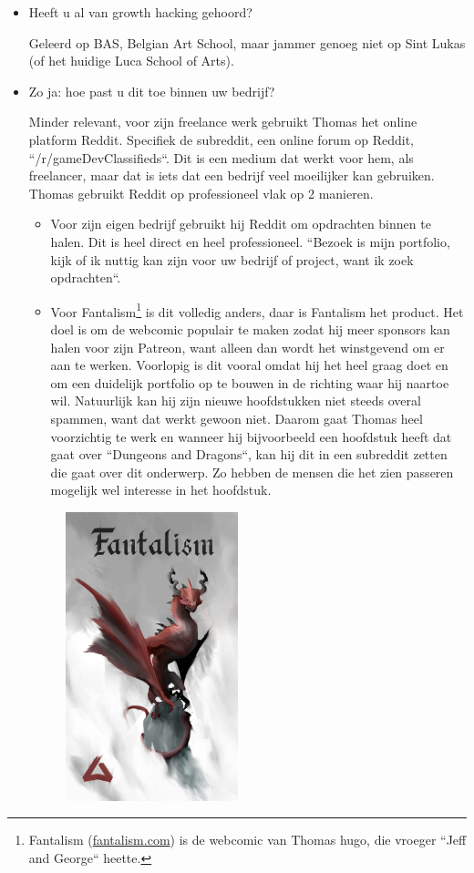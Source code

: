 \begin{itemize} 
	\item Heeft u al van growth hacking gehoord?
	
Geleerd op BAS, Belgian Art School, maar jammer genoeg niet op Sint Lukas (of het huidige Luca School of Arts). 
	
	\item Zo ja: hoe past u dit toe binnen uw bedrijf?
	
	Minder relevant, voor zijn freelance werk gebruikt Thomas het online platform Reddit. Specifiek de subreddit, een online forum op Reddit, ``/r/gameDevClassifieds``. Dit is een medium dat werkt voor hem, als freelancer, maar dat is iets dat een bedrijf veel moeilijker kan gebruiken. Thomas gebruikt Reddit op professioneel vlak op 2 manieren. 
	
	\begin{itemize} 
		\item Voor zijn eigen bedrijf gebruikt hij Reddit om opdrachten binnen te halen. Dit is heel direct en heel professioneel. ``Bezoek is mijn portfolio, kijk of ik nuttig kan zijn voor uw bedrijf of project, want ik zoek opdrachten``.
		\item Voor Fantalism\footnote{Fantalism (\href{https://fantalism.com/}{fantalism.com}) is de webcomic van Thomas hugo, die vroeger ``Jeff and George`` heette.} is dit volledig anders, daar is Fantalism het product. Het doel is om de webcomic populair te maken zodat hij meer sponsors kan halen voor zijn Patreon, want alleen dan wordt het winstgevend om er aan te werken. Voorlopig is dit vooral omdat hij het heel graag doet en om een duidelijk portfolio op te bouwen in de richting waar hij naartoe wil. Natuurlijk kan hij zijn nieuwe hoofdstukken niet steeds overal spammen, want dat werkt gewoon niet. Daarom gaat Thomas heel voorzichtig te werk en wanneer hij bijvoorbeeld een hoofdstuk heeft dat gaat over ``Dungeons and Dragons``, kan hij dit in een subreddit zetten die gaat over dit onderwerp. Zo hebben de mensen die het zien passeren mogelijk wel interesse in het hoofdstuk.
	\end{itemize} 
	\begin{figure}[h!]
		\includegraphics[width=50mm,scale=0.5]{img/arnesson-art-fantalism.jpg}

\end{figure}
\end{itemize}
